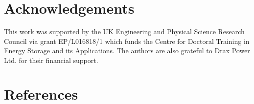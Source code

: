 \documentclass[preprint,3p,review,authoryear,10pt]{elsarticle}
\begin{document}
\section{Acknowledgements}

This work was supported by the UK Engineering and Physical Science Research Council via grant EP/L016818/1 which funds the Centre for Doctoral Training in Energy Storage and its Applications. The authors are also grateful to Drax Power Ltd. for their financial support.


\section*{References}


\end{document}
